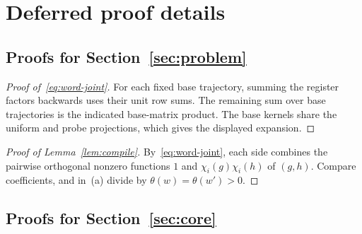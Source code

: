 %

\section{Deferred proof details}\label{app:proofs}

\subsection{Proofs for Section~\ref{sec:problem}}\label{app:problem-proofs}

\begin{proof}[Proof of~\eqref{eq:word-joint}]
For each fixed base trajectory, summing the register factors backwards uses
their unit row sums. The remaining sum over base trajectories is the
indicated base-matrix product. The base kernels share the uniform and probe
projections, which gives the displayed expansion.
\end{proof}

\begin{proof}[Proof of Lemma~\ref{lem:compile}]
By~\eqref{eq:word-joint}, each side combines the pairwise orthogonal
nonzero functions $1$ and $\chi_i(g)\chi_i(h)$ of $(g,h)$. Compare
coefficients, and in~(a) divide by $\theta(w)=\theta(w')>0$.
\end{proof}

\subsection{Proofs for Section~\ref{sec:core}}\label{app:core-proofs}

